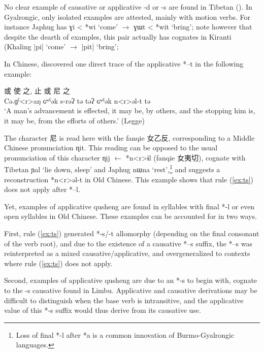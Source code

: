 \documentclass[oldfontcommands,oneside,a4paper,11pt]{article}
\newcommand{\ipa}[1]{{\phon \mbox{#1}}} %
\newcommand{\zh}[1]{{\cn #1}}
\begin{document}
No clear example of causative or applicative \ipa{-d} or \ipa{-s} are found in Tibetan (\citealt[630]{hill14derivational}). In Gyalrongic, only isolated examples are attested, mainly with motion verbs. For instance Japhug has \ipa{ɣi} < *\ipa{wi} `come' $\rightarrow$ \ipa{ɣɯt} < *\ipa{wit} `bring'; note however that despite  the dearth of examples, this pair actually has cognates in Kiranti (Khaling \ipa{|pi|} `come' $\rightarrow$ \ipa{|pit|} `bring';

In Chinese, \citet{sagart04directions} discovered one direct trace of the applicative *\ipa{--t}  in the following example:

\begin{exe}
\ex 
\gll \zh{行} \zh{或} \zh{使} \zh{之}, \zh{止} \zh{或} \zh{尼} \zh{之} \\
 \ipa{Cə.ɡˁ<r>aŋ}  \ipa{ɢʷˁək}  \ipa{s-rəʔ}  \ipa{tə}  \ipa{təʔ}  \ipa{ɢʷˁək}  \ipa{n<r>əl-t}  \ipa{tə} \\
\glt `A man's advancement is effected, it may be, by others, and the stopping him is, it may be, from the efforts of others.' (Legge)
\end{exe}

The character \zh{尼} is read here with the fanqie \zh{女乙反}, corresponding to a Middle Chinese pronunciation \ipa{ɳit}. This reading can be opposed to the usual pronunciation of this character \ipa{ɳij} $\leftarrow$ *\ipa{n<r>ɨl}  (fanqie \zh{女夷切}), cognate with Tibetan \ipa{ɲal} `lie down, sleep' and Japhug \ipa{nɯna} `rest',\footnote{Loss of final *\ipa{-l} after *\ipa{a} is a common innovation of Burmo-Gyalrongic languages.} and suggests a reconstruction *\ipa{n<r>əl-t} in Old Chinese. This example shows that rule (\ref{ex:ts}) does not apply after *\ipa{--l}.

 Yet, examples of  applicative qusheng are found in syllables with final *\ipa{-l} or even open syllables in Old Chinese. These examples can be accounted for in two ways.
 
 First, rule (\ref{ex:ts}) generated *\ipa{-s}/\ipa{-t} allomorphy (depending on the final consonant of the verb root), and due to the existence of a causative *\ipa{--s} suffix, the *\ipa{--s} was reinterpreted as a mixed causative/applicative, and overgeneralized to contexts where rule (\ref{ex:ts}) does not apply.
 
Second, examples of  applicative qusheng are due to an *\ipa{-s} to begin with, cognate to the \ipa{-s} causative found in Limbu. Applicative and causative derivations may be difficult to distinguish when the base verb is intransitive, and the applicative value of this *\ipa{-s} suffix would thus derive from its causative use.
\end{document}
